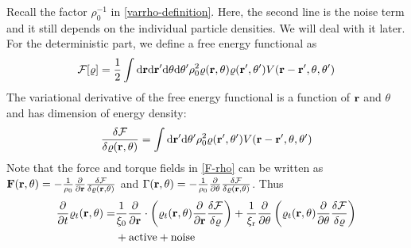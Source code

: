 \documentclass[a5paper]{article}
\begin{document}
Recall the factor $\rho_0^{-1}$ in \cref{varrho-definition}.
Here, the second line is the noise term and it still depends on the individual particle densities. We will deal with it later.
For the deterministic part, we define a free energy functional as
\begin{align}
    \label{free-energy-functional-definition}
    \mathcal{F}[\varrho] = \frac{1}{2}\int \mathrm{d}\mathbf{r} \mathrm{d}\mathbf{r}'\mathrm{d}\theta \mathrm{d}\theta' \rho_0^2\varrho(\mathbf{r}, \theta) \varrho(\mathbf{r}', \theta') V(\mathbf{r}-\mathbf{r}', \theta, \theta')
\end{align}
The variational derivative of the free energy functional is a function of $\mathbf{r}$ and $\theta$ and has dimension of energy density:
\begin{align}
    \frac{\delta\mathcal{F}}{\delta\varrho(\mathbf{r}, \theta)} = \int \mathrm{d}\mathbf{r}' \mathrm{d}\theta' \rho_0^2 \varrho(\mathbf{r}', \theta') V(\mathbf{r}-\mathbf{r}', \theta, \theta')
\end{align}
Note that the force and torque fields in \cref{F-rho} can be written as $\mathbf{F}(\mathbf{r}, \theta) = -\frac{1}{\rho_0}\frac{\partial }{\partial \mathbf{r}}\frac{\delta\mathcal{F}}{\delta\varrho(\mathbf{r}, \theta)}$ and $\Gamma(\mathbf{r}, \theta) = -\frac{1}{\rho_0} \frac{\partial }{\partial \theta}\frac{\delta\mathcal{F}}{\delta\varrho(\mathbf{r}, \theta)}$.
Thus
\begin{align}
    \frac{\partial }{\partial t}\varrho_t(\mathbf{r}, \theta) =& 
    \frac{1}{\xi_0}\frac{\partial }{\partial \mathbf{r}}\cdot\left(\varrho_t(\mathbf{r}, \theta)\frac{\partial }{\partial \mathbf{r}}\frac{\delta\mathcal{F}}{\delta\varrho}\right)
    +\frac{1}{\xi_{\rm r}}\frac{\partial }{\partial \theta}\left(\varrho_t(\mathbf{r}, \theta)\frac{\partial }{\partial \theta}\frac{\delta\mathcal{F}}{\delta\varrho}\right)
    \\
    &
    +\text{active}
   +\text{noise}
\end{align}
\end{document}
